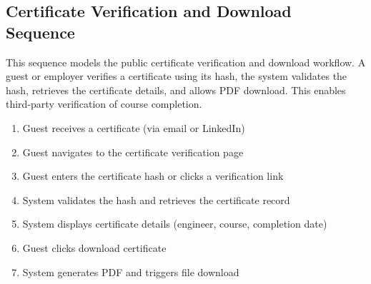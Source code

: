 %

\subsection{Certificate Verification and Download Sequence}
This sequence models the public certificate verification and download workflow.
A guest or employer verifies a certificate using its hash, the system validates
the hash, retrieves the certificate details, and allows PDF download. This
enables third-party verification of course completion.

\begin{enumerate}[topsep=0pt,itemsep=1pt,parsep=0pt,partopsep=0pt]
    \item Guest receives a certificate (via email or LinkedIn)
    \item Guest navigates to the certificate verification page
    \item Guest enters the certificate hash or clicks a verification link
    \item System validates the hash and retrieves the certificate record
    \item System displays certificate details (engineer, course, completion date)
    \item Guest clicks download certificate
    \item System generates PDF and triggers file download
\end{enumerate}

%

